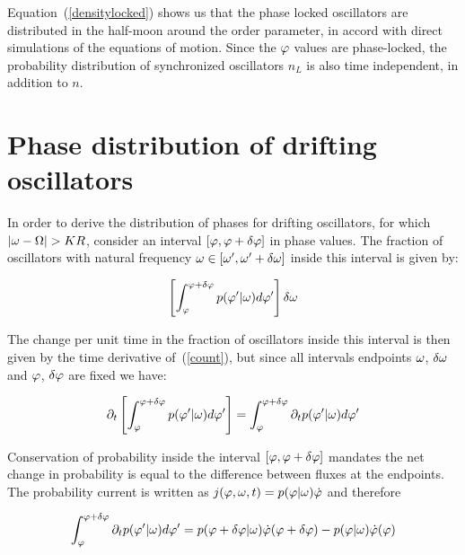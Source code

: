 Equation~(\ref{densitylocked}) shows us that the phase locked oscillators are distributed in the half-moon around the order parameter,
in accord with direct simulations of the equations of motion. Since the $\varphi$ values are phase-locked, the probability
distribution of synchronized oscillators $n_L$ is also time independent, in addition to $n$.

\section{Phase distribution of drifting oscillators}

In order to derive the distribution of phases for drifting oscillators, for which $|\omega - \Omega| > K R$, consider an interval
$[\varphi, \varphi + \delta \varphi ]$ in phase values. The fraction of oscillators with natural frequency $\omega \in [\omega',
\omega' + \delta\omega]$ inside this interval is given by:

\begin{align}
	\left[ \int_{\varphi}^{\varphi + \delta \varphi} p(\varphi' | \omega) d\varphi' \right] \delta \omega
	\label{count}
\end{align}

The change per unit time in the fraction of oscillators inside this interval is then given by the time derivative of~(\ref{count}), but
since all intervals endpoints $\omega$, $\delta\omega$ and $\varphi$, $\delta\varphi$ are fixed we have:

\begin{equation}
	\partial_t \left[ \int_{\varphi}^{\varphi + \delta \varphi} p(\varphi' | \omega) d\varphi' \right] =
	\int_{\varphi}^{\varphi + \delta \varphi}\partial_t p(\varphi' | \omega) d\varphi'
\end{equation}

\noindent Conservation of probability inside the interval $[\varphi,\varphi+\delta\varphi]$ mandates the net change in
probability is equal to the difference between fluxes at the endpoints. The probability current is written as $j(\varphi, \omega, t)
= p(\varphi|\omega)\dot{\varphi}$ and therefore

\begin{align}
	\int_{\varphi}^{\varphi + \delta \varphi}\partial_t p(\varphi' | \omega) d\varphi' =
	p(\varphi + \delta\varphi|\omega)\dot{\varphi}(\varphi + \delta\varphi) - p(\varphi|\omega)\dot{\varphi}(\varphi)
	\label{control_interval}
\end{align}

